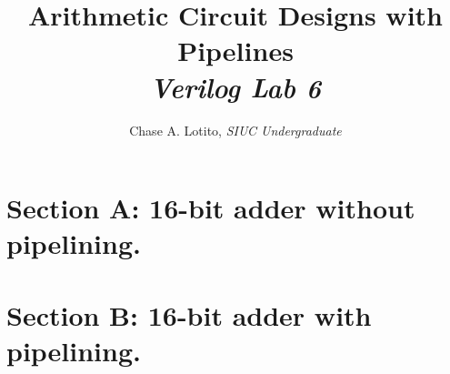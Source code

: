 \documentclass{article}
\title{\vspace{-3cm}Arithmetic Circuit Designs with Pipelines \\ {\normalsize \textit{Verilog Lab 6}}}
\author{Chase A. Lotito, \textit{SIUC Undergraduate}}
\date{}
\begin{document}
\pagestyle{fancy}

\fancyhead{}

\maketitle %

\section*{Section A: 16-bit adder without pipelining.}





%

\section*{Section B: 16-bit adder with pipelining.}





%
\end{document}
